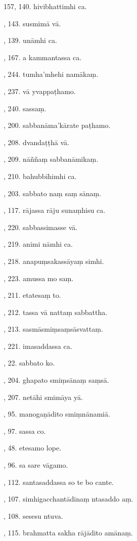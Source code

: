 157, 140. hivibhattimhi ca.\par {}, 143. susmimā vā.\par {}, 139. unāmhi ca.\par {}, 167. a kammantassa ca.\par {}, 244. tumha’mhehi namākaṃ.\par {}, 237. vā yvappaṭhamo.\par {}, 240. sassaṃ.\par {}, 200. sabbanāma’kārate paṭhamo.\par {}, 208. dvandaṭṭhā vā.\par {}, 209. nāññaṃ sabbanāmikaṃ.\par {}, 210. bahubbīhimhi ca.\par {}, 203. sabbato naṃ saṃ sānaṃ.\par {}, 117. rājassa rāju sunaṃhisu ca.\par {}, 220. sabbassimasse vā.\par {}, 219. animi nāmhi ca.\par {}, 218. anapuṃsakassāyaṃ simhi.\par {}, 223. amussa mo saṃ.\par {}, 211. etatesaṃ to.\par {}, 212. tassa vā nattaṃ sabbattha.\par {}, 213. sasmāsmiṃsaṃsāsvattaṃ.\par {}, 221. imasaddassa ca.\par {}, 22. sabbato ko.\par {}, 204. ghapato smiṃsānaṃ saṃsā.\par {}, 207. netāhi smimāya yā.\par {}, 95. manogaṇādito smiṃnānamiā.\par {}, 97. sassa co.\par {}, 48. etesamo lope.\par {}, 96. sa sare vāgamo.\par {}, 112. santasaddassa so te bo cante.\par {}, 107. simhigacchantādīnaṃ ntasaddo aṃ.\par {}, 108. sesesu ntuva.\par {}, 115. brahmatta sakha rājādito amānaṃ.\par \noindent
